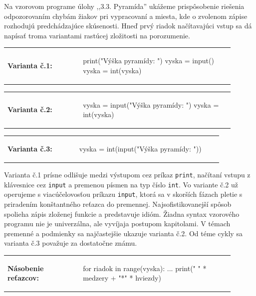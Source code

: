Na vzorovom programe úlohy ,,3.3. Pyramída'' ukážeme prispôsobenie riešenia odpozorovaním chybám žiakov pri vypracovaní a miesta, kde o zvolenom zápise rozhodujú predchádzajúce skúsenosti. Hneď prvý riadok načítavajúci vstup sa dá napísať troma variantami rastúcej zložitosti na porozumenie. 

\begin{tabular}{@{}p{0.3\linewidth}p{0.6\linewidth}}
\textbf{\small Varianta č.1:} &
\vspace{-1em}
\begin{solution}
print("Výška pyramídy: ")
vyska = input()
vyska = int(vyska)
\end{solution}
\end{tabular}

\vspace{-2em}
\begin{tabular}{@{}p{0.3\linewidth}p{0.6\linewidth}}
\textbf{\small Varianta č.2:} &
\vspace{-1em}
\begin{solution}
vyska = input("Výška pyramídy: ")
vyska = int(vyska)
\end{solution}
\end{tabular}

\vspace{-2em}
\begin{tabular}{@{}p{0.3\linewidth}p{0.6\linewidth}}
\textbf{\small Varianta č.3:} &
\vspace{-1em}
\begin{solution}
vyska = int(input("Výška pyramídy: "))
\end{solution}
\end{tabular}

Varianta č.1 prísne odlišuje medzi výstupom cez príkaz \verb|print|, načítaní vstupu z klávesnice cez \verb|input| a premenou písmen na typ číslo \verb|int|. Vo variante č.2 už operujeme s viacúčelovosťou príkazu \verb|input|, ktorá sa v skorších fázach pletie s priradením konštantného reťazca do premennej. Najsofistikovanejší spôsob spolieha zápis zloženej funkcie a predstavuje idióm. Žiadna syntax vzorového programu nie je univerzálna, ale vyvíjaja postupom kapitolami. V témach premenné a podmienky sa najčastejšie ukazuje varianta č.2. Od téme cykly sa varianta č.3 považuje za dostatočne známu.

\begin{tabular}{@{}p{0.3\linewidth}p{0.6\linewidth}}
\textbf{\small Násobenie reťazcov:} &
\vspace{-1em}
\begin{solution}
for riadok in range(vyska):
	...
	print(" " * medzery + "*" * hviezdy)
\end{solution}
\end{tabular}

